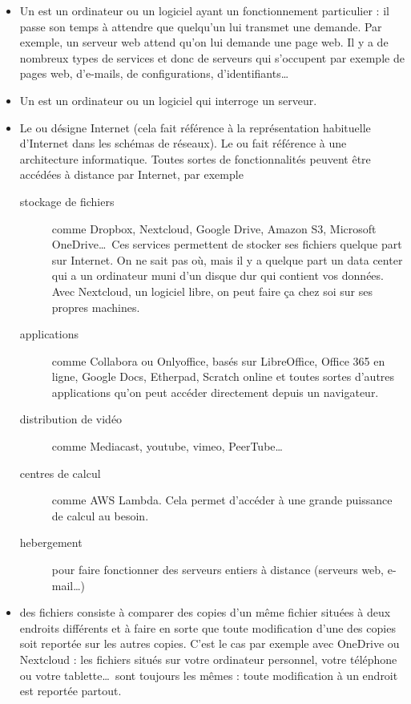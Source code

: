 \documentclass[10pt,a4paper]{report}
\begin{document}
\begin{itemize}
	\item Un  est un ordinateur ou un logiciel ayant un fonctionnement particulier : il passe son temps à attendre que quelqu'un lui transmet une demande. Par exemple, un serveur web attend qu'on lui demande une page web. Il y a de nombreux types de services et donc de serveurs qui s'occupent par exemple de pages web, d'e-mails, de configurations, d'identifiants\dots 
	\item Un  est un ordinateur ou un logiciel qui interroge un serveur.
	\item Le  ou  désigne Internet (cela fait référence à la représentation habituelle d'Internet dans les schémas de réseaux). Le  ou  fait référence à une architecture informatique. Toutes sortes de fonctionnalités peuvent être accédées à distance par Internet, par exemple
		\begin{description}
			\item[stockage de fichiers] comme Dropbox, Nextcloud, Google Drive, Amazon S3, Microsoft OneDrive\dots \ Ces services permettent de stocker ses fichiers quelque part sur Internet. On ne sait pas où, mais il y a quelque part un data center qui a un ordinateur muni d'un disque dur qui contient vos données. Avec Nextcloud, un logiciel libre, on peut faire ça chez soi sur ses propres machines.
			\item[applications] comme Collabora ou Onlyoffice, basés sur LibreOffice, Office 365 en ligne, Google Docs, Etherpad, Scratch online et toutes sortes d'autres applications qu'on peut accéder directement depuis un navigateur.
			\item[distribution de vidéo] comme Mediacast, youtube, vimeo, PeerTube\dots
			\item[centres de calcul] comme AWS Lambda. Cela permet d'accéder à une grande puissance de calcul au besoin.
			\item[hebergement] pour faire fonctionner des serveurs entiers à distance (serveurs web, e-mail\dots)
		\end{description}
	\item {} des fichiers consiste à comparer des copies d'un même fichier situées à deux endroits différents et à faire en sorte que toute modification d'une des copies soit reportée sur les autres copies. C'est le cas par exemple avec OneDrive ou Nextcloud : les fichiers situés sur votre ordinateur personnel, votre téléphone ou votre tablette\dots \ sont toujours les mêmes : toute modification à un endroit est reportée partout. \\[1ex]

\end{itemize}
\end{document}
